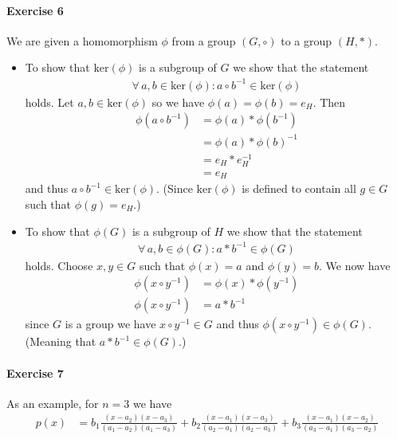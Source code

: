 \documentclass{article}
\begin{document}
\paragraph{Exercise 6}

We are given a homomorphism $\phi$ from a group $(G, \circ)$ to a group $(H, *)$.

\begin{itemize}
    \item To show that $\text{ker}(\phi)$ is a subgroup of $G$ we show that the statement
    \begin{align*}
        \forall\, a, b \in \text{ker}(\phi) :  a \circ b^{-1} \in \text{ker}(\phi)
    \end{align*}
    holds. Let $a, b \in \text{ker}(\phi)$ so we have $\phi(a) = \phi(b) = e_H$. Then
    \begin{align*}
        \phi(a \circ b^{-1}) &= \phi(a) * \phi(b^{-1}) \\
        &= \phi(a) * \phi(b)^{-1} \\
        &= e_H * e_H^{-1} \\
        &= e_H
    \end{align*}
    and thus $a \circ b^{-1} \in \text{ker}(\phi)$. (Since $\text{ker}(\phi)$ is defined to contain all $g \in G$ such that $\phi(g) = e_H$.)

    \item To show that $\phi(G)$ is a subgroup of $H$ we show that the statement
    \begin{align*}
        \forall\, a, b \in \phi(G):  a * b^{-1} \in \phi(G)
    \end{align*}
    holds. Choose $x, y \in G$ such that $\phi(x) = a$ and $\phi(y) = b$. We now have
    \begin{align*}
        \phi(x \circ y^{-1}) &= \phi(x) * \phi(y^{-1}) \\
        \phi(x \circ y^{-1}) &= a * b^{-1}
    \end{align*}
    since $G$ is a group we have $x \circ y^{-1} \in G$ and thus $\phi(x \circ y^{-1}) \in \phi(G)$. (Meaning that $a * b^{-1} \in \phi(G)$.)
\end{itemize}

\paragraph{Exercise 7}

As an example, for $n = 3$ we have
\begin{align*}
    p(x) &= b_1 \frac{(x - a_2)(x - a_3)}{(a_1 - a_2)(a_1 - a_3)} + b_2 \frac{(x - a_1)(x - a_3)}{(a_2 - a_1)(a_2 - a_3)} + b_3 \frac{(x - a_1)(x - a_2)}{(a_3 - a_1)(a_3 - a_2)}
\end{align*}
\end{document}
